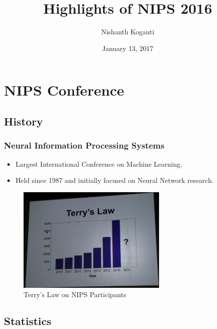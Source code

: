 \documentclass[11pt,
               hyperref={colorlinks,citecolor=pink,linkcolor=red,urlcolor=blue}
               ]{beamer}
\title[NIPS Highlights]{Highlights of NIPS 2016}
\author[Nishanth]{Nishanth Koganti}
\institute[NAIST]{Research Student, Shibata Lab \\ \tiny{Kyushu Institute of Technology}}
\date{January 13, 2017}
\begin{document}
  \begin{frame}[noframenumbering]
    \titlepage
  \end{frame}

  \section{NIPS Conference}

  \subsection{History}

  \begin{frame}
    \frametitle{Neural Information Processing Systems}

    \begin{itemize}
      \item Largest International Conference on Machine Learning.
      \item Held since 1987 and initially focused on Neural Network research.
    \end{itemize}

    \begin{figure}
      \centering
      \includegraphics[width=0.65\textwidth]{terryLaw.jpg}
      \caption*{Terry's Law on NIPS Participants \footnotemark[1]}
    \end{figure}

  \end{frame}

  \subsection{Statistics}
\end{document}
